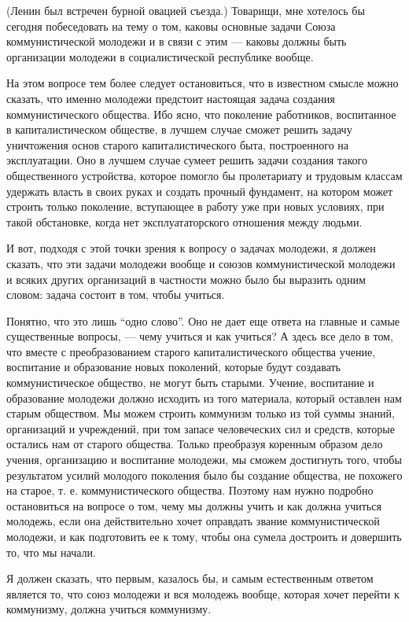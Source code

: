 \documentclass[12pt]{article}
\newcommand{\parnum}{(\arabic{parcount})}
\newcounter{parcount}
\newenvironment{parnumbers}{%
  \par%
  \everypar{\noindent \stepcounter{parcount}\marginpar[]{\parnum}}%
}{}
\begin{document}
\begin{parnumbers}
(Ленин был встречен бурной овацией съезда.) Товарищи, мне хотелось бы сегодня побеседовать на тему о том, каковы основные задачи Союза коммунистической молодежи и в связи с этим — каковы должны быть организации молодежи в социалистической республике вообще.

На этом вопросе тем более следует остановиться, что в известном смысле можно сказать, что именно молодежи предстоит настоящая задача создания коммунистического общества. Ибо ясно, что поколение работников, воспитанное в капиталистическом обществе, в лучшем случае сможет решить задачу уничтожения основ старого капиталистического быта, построенного на эксплуатации. Оно в лучшем случае сумеет решить задачи создания такого общественного устройства, которое помогло бы пролетариату и трудовым классам удержать власть в своих руках и создать прочный фундамент, на котором может строить только поколение, вступающее в работу уже при новых условиях, при такой обстановке, когда нет эксплуататорского отношения между людьми.

И вот, подходя с этой точки зрения к вопросу о задачах молодежи, я должен сказать, что эти задачи молодежи вообще и союзов коммунистической молодежи и всяких других организаций в частности можно было бы выразить одним словом: задача состоит в том, чтобы учиться.

Понятно, что это лишь “одно слово”. Оно не дает еще ответа на главные и самые существенные вопросы, — чему учиться и как учиться? А здесь все дело в том, что вместе с преобразованием старого капиталистического общества учение, воспитание и образование новых поколений, которые будут создавать коммунистическое общество, не могут быть старыми. Учение, воспитание и образование молодежи должно исходить из того материала, который оставлен нам старым обществом. Мы можем строить коммунизм только из той суммы знаний, организаций и учреждений, при том запасе человеческих сил и средств, которые остались нам от старого общества. Только преобразуя коренным образом дело учения, организацию и воспитание молодежи, мы сможем достигнуть того, чтобы результатом усилий молодого поколения было бы создание общества, не похожего на старое, т. е. коммунистического общества. Поэтому нам нужно подробно остановиться на вопросе о том, чему мы должны учить и как должна учиться молодежь, если она действительно хочет оправдать звание коммунистической молодежи, и как подготовить ее к тому, чтобы она сумела достроить и довершить то, что мы начали.

Я должен сказать, что первым, казалось бы, и самым естественным ответом является то, что союз молодежи и вся молодежь вообще, которая хочет перейти к коммунизму, должна учиться коммунизму.


\end{parnumbers}
\end{document}
